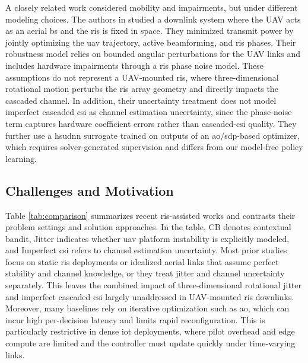 \documentclass[letterpaper,journal]{IEEEtran}
\begin{document}
A closely related work considered mobility and impairments, but under different modeling choices. The authors in \cite{adam2023intelligent} studied a downlink system where the UAV acts as an aerial \gls{bs} and the \gls{ris} is fixed in space. They minimized transmit power by jointly optimizing the \gls{uav} trajectory, active beamforming, and \gls{ris} phases. Their robustness model relies on bounded angular perturbations for the UAV links and includes hardware impairments through a \gls{ris} phase noise model. These assumptions do not represent a UAV-mounted \gls{ris}, where three-dimensional rotational motion perturbs the \gls{ris} array geometry and directly impacts the cascaded channel. In addition, their uncertainty treatment does not model imperfect cascaded \gls{csi} as channel estimation uncertainty, since the phase-noise term captures hardware coefficient errors rather than cascaded-\gls{csi} quality. They further use a \gls{hsudnn} surrogate trained on outputs of an \gls{ao}/\gls{sdp}-based optimizer, which requires solver-generated supervision and differs from our model-free policy learning.



\subsection{Challenges and Motivation}
Table \ref{tab:comparison} summarizes recent \gls{ris}-assisted works and contrasts their problem settings and solution approaches. In the table, CB denotes contextual bandit, Jitter indicates whether \gls{uav} platform instability is explicitly modeled, and Imperfect \gls{csi} refers to channel estimation uncertainty. Most prior studies focus on static \gls{ris} deployments or idealized aerial links that assume perfect stability and channel knowledge, or they treat jitter and channel uncertainty separately. This leaves the combined impact of three-dimensional rotational jitter and imperfect cascaded \gls{csi} largely unaddressed in UAV-mounted \gls{ris} downlinks. Moreover, many baselines rely on iterative optimization such as \gls{ao}, which can incur high per-decision latency and limits rapid reconfiguration. This is particularly restrictive in dense \gls{iot} deployments, where pilot overhead and edge compute are limited and the controller must update quickly under time-varying links.
\end{document}
